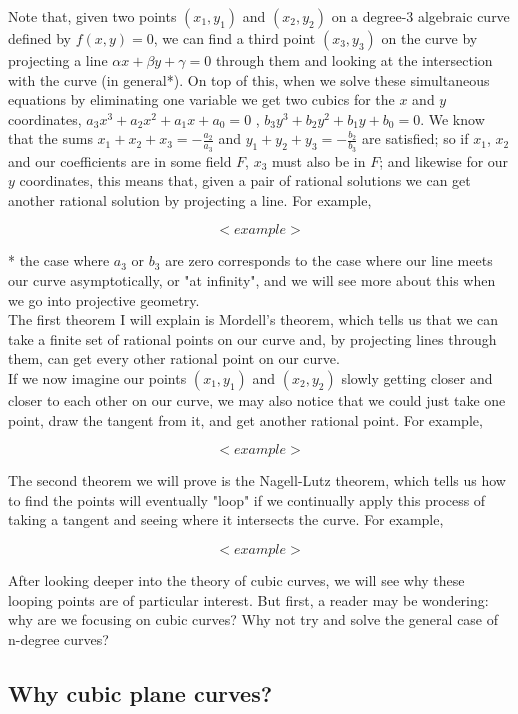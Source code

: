\documentclass{article}
\begin{document}
Note that, given two points $(x_1, y_1)$ and $(x_2, y_2)$ on a degree-3 algebraic curve defined by $f(x, y) = 0$, we can find a third point $(x_3, y_3)$ on the curve by projecting a line $\alpha x + \beta y + \gamma = 0$ through them and looking at the intersection with the curve (in general*). On top of this, when we solve these simultaneous equations by eliminating one variable we get two cubics for the $x$ and $y$ coordinates, $a_3 x^3 + a_2 x^2 + a_1 x + a_0 = 0$ , \quad $b_3 y^3 + b_2 y^2 + b_1 y + b_0 = 0$. We know that the sums $x_1 + x_2 + x_3 = -\frac{a_2}{a_3}$ and $y_1 + y_2 + y_3 = -\frac{b_2}{b_3}$ are satisfied; so if $x_1$, $x_2$ and our coefficients are in some field $F$, $x_3$ must also be in $F$; and likewise for our $y$ coordinates, this means that, given a pair of rational solutions we can get another rational solution by projecting a line. For example,


\[ <example> \]

* the case where $a_3$ or $b_3$ are zero corresponds to the case where our line meets our curve asymptotically, or "at infinity", and we will see more about this when we go into projective geometry.\\ 

The first theorem I will explain is Mordell's theorem, which tells us that we can take a finite set of rational points on our curve and, by projecting lines through them, can get every other rational point on our curve.\\

If we now imagine our points $(x_1, y_1)$ and $(x_2, y_2)$ slowly getting closer and closer to each other on our curve, we may also notice that we could just take one point, draw the tangent from it, and get another rational point. For example, 

\[<example>\]

The second theorem we will prove is the Nagell-Lutz theorem, which tells us how to find the points will eventually "loop" if we continually apply this process of taking a tangent and seeing where it intersects the curve. For example,

\[<example>\]

After looking deeper into the theory of cubic curves, we will see why these looping points are of particular interest. But first, a reader may be wondering: why are we focusing on cubic curves? Why not try and solve the general case of n-degree curves?

\subsection{Why cubic plane curves?}
\end{document}
